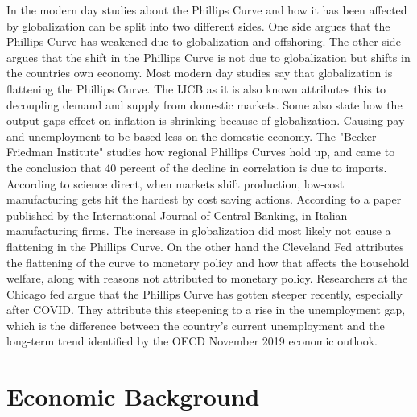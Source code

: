 \documentclass{article}
\begin{document}
In the modern day studies about the Phillips Curve and how it has been affected by globalization can be split into two different sides. One side argues that the Phillips Curve has weakened due to globalization and offshoring\autocite{substack_offshoring}. The other side argues that the shift in the Phillips Curve is not due to globalization but shifts in the countries own economy.  Most modern day studies say that globalization is flattening the Phillips Curve\autocite{gaiotti2010}. The IJCB as it is also known attributes this to decoupling demand and supply from domestic markets. Some also state how the output gaps effect on inflation is shrinking because of globalization. Causing pay and unemployment to be based less on the domestic economy\autocite{Kohlscheen2022}. The "Becker Friedman Institute" studies how regional Phillips Curves hold up, and came to the conclusion that 40 percent of the decline in correlation is due to imports\autocite{uchicago_dynamics}. According to science direct, when markets shift production, low-cost manufacturing gets hit the hardest by cost saving actions. According to a paper published by the International Journal of Central Banking\autocite{gaiotti2010}, in Italian manufacturing firms. The increase in globalization did most likely not cause a flattening in the Phillips Curve. On the other hand the Cleveland Fed \autocite{Cleveland-fed} attributes the flattening of the curve to monetary policy and how that affects the household welfare, along with reasons not attributed to monetary policy. Researchers at the Chicago fed\autocite{Chicago-fed} argue that the Phillips Curve has gotten steeper recently, especially after COVID. They attribute this steepening to a rise in the unemployment gap, which is the difference between the country's current unemployment and the long-term trend identified by the OECD November 2019 economic outlook.

\section{Economic Background}
\end{document}
